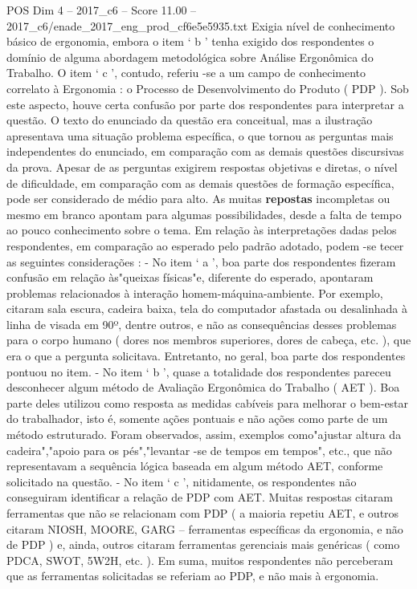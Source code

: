 \begin{textsample}{POS Dim 4 – 2017\_c6 – Score 11.00 – 2017\_c6/enade\_2017\_eng\_prod\_cf6e5e5935.txt}
Exigia nível de conhecimento básico de ergonomia, embora o item ‘ b ’ tenha exigido dos respondentes o domínio de alguma abordagem metodológica sobre Análise Ergonômica do Trabalho.
O item ‘ c ’, contudo, referiu -se a um campo de conhecimento correlato à Ergonomia : o Processo de Desenvolvimento do Produto ( PDP ).
Sob este aspecto, houve certa confusão por parte dos respondentes para interpretar a questão.
O texto do enunciado da questão era conceitual, mas a ilustração apresentava uma situação problema específica, o que tornou as perguntas mais independentes do enunciado, em comparação com as demais questões discursivas da prova.
Apesar de as perguntas exigirem respostas objetivas e diretas, o nível de dificuldade, em comparação com as demais questões de formação específica, pode ser considerado de médio para alto.
As muitas \textbf{repostas} incompletas ou mesmo em branco apontam para algumas possibilidades, desde a falta de tempo ao pouco conhecimento sobre o tema.
Em relação às interpretações dadas pelos respondentes, em comparação ao esperado pelo padrão adotado, podem -se tecer as seguintes considerações : - No item ‘ a ’, boa parte dos respondentes fizeram confusão em relação às"queixas físicas"e, diferente do esperado, apontaram problemas relacionados à interação homem-máquina-ambiente.
Por exemplo, citaram sala escura, cadeira baixa, tela do computador afastada ou desalinhada à linha de visada em 90º, dentre outros, e não as consequências desses problemas para o corpo humano ( dores nos membros superiores, dores de cabeça, etc. ), que era o que a pergunta solicitava.
Entretanto, no geral, boa parte dos respondentes pontuou no item. - No item ‘ b ’, quase a totalidade dos respondentes pareceu desconhecer algum método de Avaliação Ergonômica do Trabalho ( AET ).
Boa parte deles utilizou como resposta as medidas cabíveis para melhorar o bem-estar do trabalhador, isto é, somente ações pontuais e não ações como parte de um método estruturado.
Foram observados, assim, exemplos como"ajustar altura da cadeira","apoio para os pés","levantar -se de tempos em tempos", etc., que não representavam a sequência lógica baseada em algum método AET, conforme solicitado na questão. - No item ‘ c ’, nitidamente, os respondentes não conseguiram identificar a relação de PDP com AET.
Muitas respostas citaram ferramentas que não se relacionam com PDP ( a maioria repetiu AET, e outros citaram NIOSH, MOORE, GARG – ferramentas específicas da ergonomia, e não de PDP ) e, ainda, outros citaram ferramentas gerenciais mais genéricas ( como PDCA, SWOT, 5W2H, etc. ).
Em suma, muitos respondentes não perceberam que as ferramentas solicitadas se referiam ao PDP, e não mais à ergonomia.

\end{textsample}
